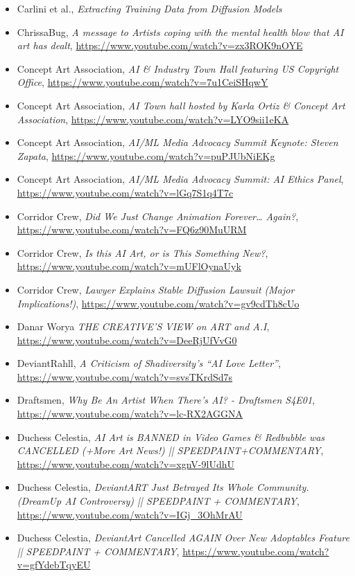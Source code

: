 \documentclass[11pt]{article}
\begin{document}
\begin{itemize}
\item Carlini et al., \emph{Extracting Training Data from Diffusion Models}
\item ChrissaBug, \emph{A message to Artists coping with the mental health blow that AI art has dealt}, \url{https://www.youtube.com/watch?v=zx3ROK9nOYE}
\item Concept Art Association, \emph{AI \& Industry Town Hall featuring US Copyright Office}, \url{https://www.youtube.com/watch?v=7u1CeiSHqwY}
\item Concept Art Association, \emph{AI Town hall hosted by Karla Ortiz \& Concept Art Association}, \url{https://www.youtube.com/watch?v=LYO9sii1eKA}
\item Concept Art Association, \emph{AI/ML Media Advocacy Summit Keynote: Steven Zapata}, \url{https://www.youtube.com/watch?v=puPJUbNiEKg}
\item Concept Art Association, \emph{AI/ML Media Advocacy Summit: AI Ethics Panel}, \url{https://www.youtube.com/watch?v=lGq7S1q4T7c}
\item Corridor Crew, \emph{Did We Just Change Animation Forever\ldots{} Again?}, \url{https://www.youtube.com/watch?v=FQ6z90MuURM}
\item Corridor Crew, \emph{Is this AI Art, or is This Something New?}, \url{https://www.youtube.com/watch?v=mUFlOynaUyk}
\item Corridor Crew, \emph{Lawyer Explains Stable Diffusion Lawsuit (Major Implications!)}, \url{https://www.youtube.com/watch?v=gv9cdTh8cUo}
\item Danar Worya \emph{THE CREATIVE'S VIEW on ART and A.I}, \url{https://www.youtube.com/watch?v=DeeRjUfVvG0}
\item DeviantRahll, \emph{A Criticism of Shadiversity's ``AI Love Letter''}, \url{https://www.youtube.com/watch?v=svsTKrdSd7s}
\item Draftsmen, \emph{Why Be An Artist When There's AI? - Draftsmen S4E01}, \url{https://www.youtube.com/watch?v=lc-RX2AGGNA}
\item Duchess Celestia, \emph{AI Art is BANNED in Video Games \& Redbubble was CANCELLED (+More Art News!) || SPEEDPAINT+COMMENTARY}, \url{https://www.youtube.com/watch?v=xgnV-9lUdhU}
\item Duchess Celestia, \emph{DeviantART Just Betrayed Its Whole Community. (DreamUp AI Controversy) || SPEEDPAINT + COMMENTARY}, \url{https://www.youtube.com/watch?v=IGj\_3OhMrAU}
\item Duchess Celestia, \emph{DeviantArt Cancelled AGAIN Over New Adoptables Feature || SPEEDPAINT + COMMENTARY}, \url{https://www.youtube.com/watch?v=gfYdebTqyEU}

\end{itemize}
\end{document}
